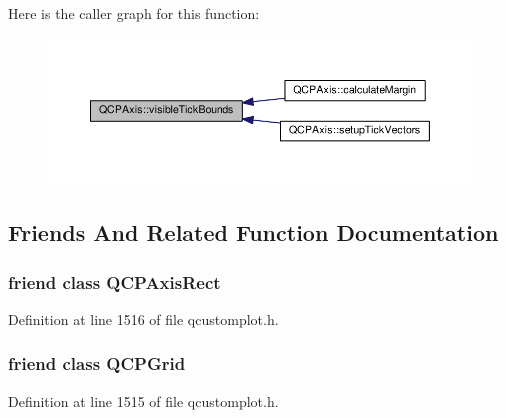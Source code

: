Here is the caller graph for this function\+:\nopagebreak
\begin{figure}[H]
\begin{center}
\leavevmode
\includegraphics[width=350pt]{class_q_c_p_axis_a06320a944d1120732cc0d72fe1306d8b_icgraph}
\end{center}
\end{figure}




\subsection{Friends And Related Function Documentation}
\hypertarget{class_q_c_p_axis_acbf20ecb140f66c5fd1bc64ae0762990}{}
\subsubsection[{Q\+C\+P\+Axis\+Rect}]{\setlength{\rightskip}{0pt plus 5cm}friend class {\bf Q\+C\+P\+Axis\+Rect}\hspace{0.3cm}{\ttfamily [friend]}}\label{class_q_c_p_axis_acbf20ecb140f66c5fd1bc64ae0762990}


Definition at line 1516 of file qcustomplot.\+h.

\hypertarget{class_q_c_p_axis_a061e177f585549fc31f780852e2bd6fe}{}
\subsubsection[{Q\+C\+P\+Grid}]{\setlength{\rightskip}{0pt plus 5cm}friend class {\bf Q\+C\+P\+Grid}\hspace{0.3cm}{\ttfamily [friend]}}\label{class_q_c_p_axis_a061e177f585549fc31f780852e2bd6fe}


Definition at line 1515 of file qcustomplot.\+h.

